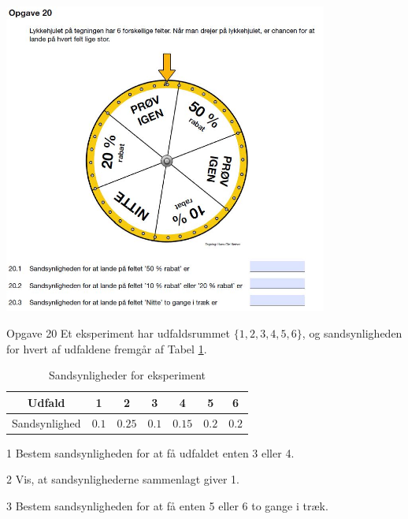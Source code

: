 \newpage

\begin{center}
	\includegraphics[width = 0.8\textwidth]{Billeder/opg20fsk}	
\end{center}

\begin{opgavetekst}{Opgave 20}
	Et eksperiment har udfaldsrummet $\{1,2,3,4,5,6\}$, og sandsynligheden for hvert af 
	udfaldene fremgår af Tabel \ref{tab:ssh}.
	\begin{table}[H]
		\centering
		\begin{tabular}{c|c|c|c|c|c|c}
			Udfald & 1 & 2 & 3 & 4 & 5 & 6 \\
			\hline
			Sandsynlighed & $0.1$ & $0.25$ & $0.1$ & $0.15$ & $0.2$ & $0.2$ 
		\end{tabular}		
		\caption{Sandsynligheder for eksperiment}
		\label{tab:ssh}
	\end{table}
	\phantom{h}
\end{opgavetekst}

\begin{delopgave}{}{1}
	Bestem sandsynligheden for at få udfaldet enten 3 eller 4.
\end{delopgave}
\begin{delopgave}{}{2}
	Vis, at sandsynlighederne sammenlagt giver 1.
\end{delopgave}
\begin{delopgave}{}{3}
	Bestem sandsynligheden for at få enten 5 eller 6 to gange i træk.
\end{delopgave}

\newpage

